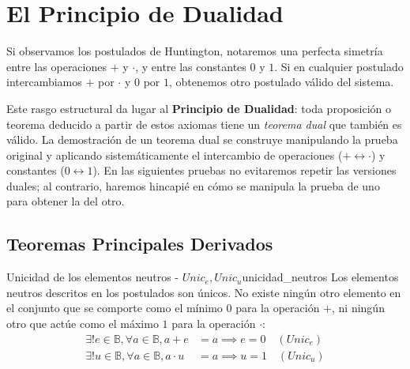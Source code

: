 \chapter{El Principio de Dualidad}
Si observamos los postulados de Huntington, notaremos una perfecta simetría entre las operaciones $+$ y $\cdot$, y entre las constantes $0$ y $1$. Si en cualquier postulado intercambiamos $+$ por $\cdot$ y $0$ por $1$, obtenemos otro postulado válido del sistema. 

Este rasgo estructural da lugar al \textbf{Principio de Dualidad}: toda proposición o teorema deducido a partir de estos axiomas tiene un \textit{teorema dual} que también es válido. La demostración de un teorema dual se construye manipulando la prueba original y aplicando sistemáticamente el intercambio de operaciones ($+ \leftrightarrow \cdot$) y constantes ($0 \leftrightarrow 1$). En las siguientes pruebas no evitaremos repetir las versiones duales; al contrario, haremos hincapié en cómo se manipula la prueba de uno para obtener la del otro.

\section{Teoremas Principales Derivados}

\begin{teorema}{Unicidad de los elementos neutros - $Unic_e, Unic_u$}{unicidad_neutros}
Los elementos neutros descritos en los postulados son únicos. No existe ningún otro elemento en el conjunto que se comporte como el mínimo $0$ para la operación $+$, ni ningún otro que actúe como el máximo $1$ para la operación $\cdot$:
\begin{align*}
    \exists! e \in \mathbb{B}, \forall a \in \mathbb{B}, a + e &= a \implies e = 0 \quad (Unic_e) \\
    \exists! u \in \mathbb{B}, \forall a \in \mathbb{B}, a \cdot u &= a \implies u = 1 \quad (Unic_u)
\end{align*}
\end{teorema}

